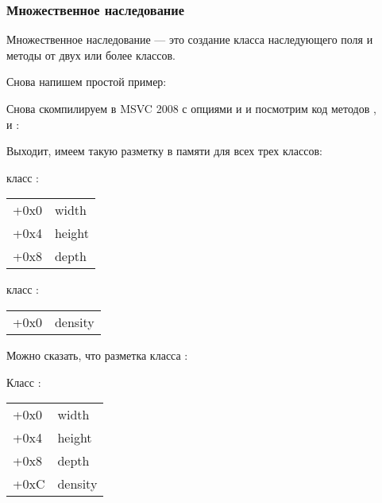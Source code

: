 \subsubsection{Множественное наследование}

Множественное наследование --- это создание класса наследующего поля и методы от двух или более классов.


Снова напишем простой пример:



Снова скомпилируем в MSVC 2008 с опциями \Ox и \Obzero и посмотрим код методов ,\\
 и :








Выходит, имеем такую разметку в памяти для всех трех классов:


класс :

\begin{center}
\begin{tabular}{ | l | l | }
\hline
  \tableheader{} \\
\hline
  +0x0 & width \\
\hline
  +0x4 & height \\
\hline
  +0x8 & depth \\
\hline
\end{tabular}
\end{center}

класс :

\begin{center}
\begin{tabular}{ | l | l | }
\hline
  \tableheader{} \\
\hline
  +0x0 & density \\
\hline
\end{tabular}
\end{center}

Можно сказать, что разметка класса  :


Класс :

\begin{center}
\begin{tabular}{ | l | l | }
\hline
  \tableheader{} \\
\hline
  +0x0 & width \\
\hline
  +0x4 & height \\
\hline
  +0x8 & depth \\
\hline
  +0xC & density \\
\hline
\end{tabular}
\end{center}

